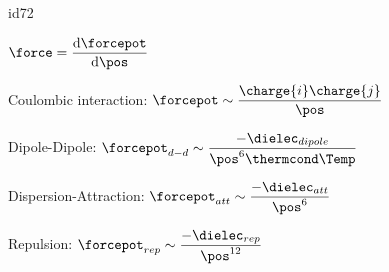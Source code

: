 \begin{mitframe}{id72}

    
    \begin{listone}
    
      \item $\force = \dfrac{\mathrm{d}\forcepot}{\mathrm{d}\pos}$

      \item Coulombic interaction: $\forcepot \sim \dfrac{\charge{i} \charge{j}}{\pos}$

      \item Dipole-Dipole: $\forcepot_{d-d} \sim \dfrac{-\dielec_{dipole}}{\pos^6\thermcond\Temp}$

      \item Dispersion-Attraction: $\forcepot_{att} \sim \dfrac{-\dielec_{att}}{\pos^6}$

      \item Repulsion: $\forcepot_{rep} \sim \dfrac{-\dielec_{rep}}{\pos^{12}}$
    
    \end{listone}
 
\end{mitframe}
